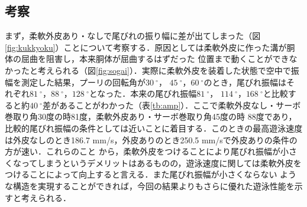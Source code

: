 \newpage
\subsection{考察}
まず，柔軟外皮あり・なしで尾びれの振り幅に差が出てしまった（図\ref{fig:kukkyoku}）ことについて考察する．原因としては柔軟外皮に作った溝が胴体の屈曲を阻害し，本来胴体が屈曲するはずだった
位置まで動くことができなかったと考えられる（図\ref{fig:sogai}）．実際に柔軟外皮を装着した状態で空中で振幅を測定した結果，プーリの回転角が$30\:^\circ$，
$45\:^\circ$，$60\:^\circ$のとき，尾びれ振幅はそれぞれ$81\:^\circ$，$88\:^\circ$，$128\:^\circ$となった．本来の尾びれ振幅$81\:^\circ$，
$114\:^\circ$，$168\:^\circ$と比較すると約$40\:^\circ$差があることがわかった（表\ref{tb:amp}）．ここで柔軟外皮なし・サーボ巻取り角30度の時81度，柔軟外皮あり・サーボ巻取り角45度の時
88度であり，比較的尾びれ振幅の条件としては近いことに着目する．このときの最高遊泳速度は外皮なしのとき186.7 mm/s，外皮ありのとき250.5 mm/sで外皮ありの条件の方が速い．これらのこと
から，柔軟外皮をつけることにより尾びれ振幅が小さくなってしまうというデメリットはあるものの，遊泳速度に関しては柔軟外皮をつけることによって向上すると言える．また尾びれ振幅が小さくならない
ような構造を実現することができれば，今回の結果よりもさらに優れた遊泳性能を示すと考えられる．

